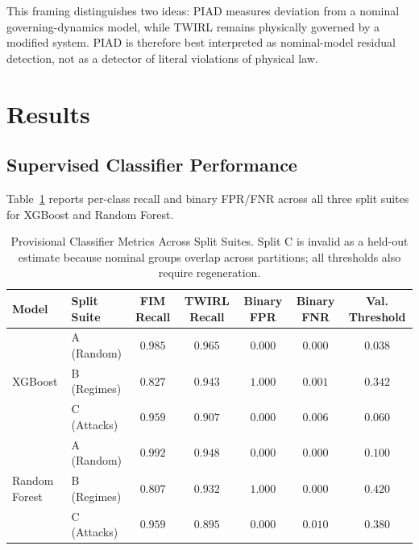 \documentclass[journal,twocolumn]{IEEEtran}
\begin{document}
This framing distinguishes two ideas: PIAD measures deviation from a nominal
governing-dynamics model, while TWIRL remains physically governed by a modified
system. PIAD is therefore best interpreted as nominal-model residual detection, not
as a detector of literal violations of physical law.

\section{Results}
\label{sec:results}

\subsection{Supervised Classifier Performance}

Table~\ref{tab:results} reports per-class recall and binary FPR/FNR across all three
split suites for XGBoost and Random Forest.

\begin{table}[t]
  \centering
  \scriptsize
  \caption{Provisional Classifier Metrics Across Split Suites. Split C is invalid as a held-out estimate because nominal groups overlap across partitions; all thresholds also require regeneration.}
  \label{tab:results}
  \renewcommand{\arraystretch}{0.9}
  \begin{tabular}{@{}llccccc@{}}
    \toprule
    Model & Split Suite & FIM Recall & TWIRL Recall & Binary FPR & Binary FNR
           & Val. Threshold \\
    \midrule
    \multirow{3}{*}{XGBoost}
      & A (Random)  & $0.985$ & $0.965$ & $0.000$ & $0.000$ & $0.038$ \\
      & B (Regimes) & $0.827$ & $0.943$ & $\mathbf{1.000}$ & $0.001$ & $0.342$ \\
      & C (Attacks) & $0.959$ & $0.907$ & $0.000$ & $0.006$ & $0.060$ \\[4pt]
    \multirow{3}{*}{Random Forest}
      & A (Random)  & $0.992$ & $0.948$ & $0.000$ & $0.000$ & $0.100$ \\
      & B (Regimes) & $0.807$ & $0.932$ & $\mathbf{1.000}$ & $0.000$ & $0.420$ \\
      & C (Attacks) & $0.959$ & $0.895$ & $0.000$ & $0.010$ & $0.380$ \\
    \bottomrule
  \end{tabular}
\end{table}
\end{document}
